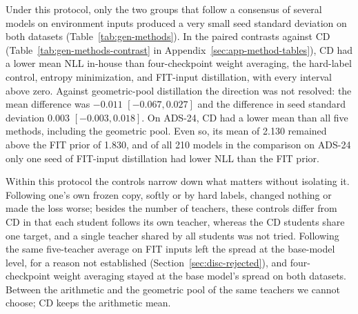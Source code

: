 Under this protocol, only the
two groups that follow a consensus of several models on environment
inputs produced a very small seed standard deviation on both datasets
(Table~\ref{tab:gen-methods}). In the paired contrasts against CD
(Table~\ref{tab:gen-methods-contrast} in
Appendix~\ref{sec:app-method-tables}), CD had a lower mean NLL in-house
than four-checkpoint weight averaging, the hard-label control, entropy
minimization, and FIT-input distillation, with every interval above
zero. Against geometric-pool distillation the
direction was not resolved: the mean difference was $-0.011$
$[-0.067, 0.027]$ and the difference in seed standard deviation $0.003$
$[-0.003, 0.018]$. On ADS-24, CD had a lower mean than all five methods,
including the geometric pool. Even so, its mean of 2.130 remained above
the FIT prior of 1.830, and of all 210 models in the comparison on
ADS-24 only one seed of FIT-input distillation had lower NLL than the
FIT prior.



Within this protocol the controls narrow down what matters without
isolating it. Following one's own frozen copy, softly or by hard
labels, changed nothing or made the loss worse; besides the number of
teachers, these controls differ from CD in that each student follows
its own teacher, whereas the CD students share one target, and a single
teacher shared by all students was not tried.
Following the same five-teacher average on FIT inputs left the spread at the base-model
level, for a reason not established (Section~\ref{sec:disc-rejected}),
and four-checkpoint weight averaging stayed at the base model's spread
on both datasets. Between the arithmetic and the geometric pool of the
same teachers we cannot choose; CD keeps the arithmetic mean.

